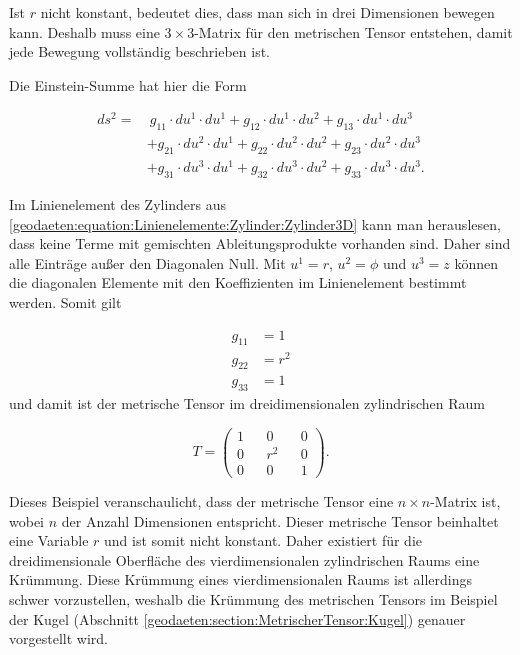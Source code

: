 Ist $r$ nicht konstant, bedeutet dies, dass man sich in drei Dimensionen bewegen kann.
Deshalb muss eine $3 \times 3$-Matrix für den metrischen Tensor entstehen, damit jede Bewegung vollständig beschrieben ist. 

Die Einstein-Summe hat hier die Form

\begin{equation}
\begin{aligned}
	ds^2 = &\ g_{11} \cdot du^1 \cdot du^1 + g_{12} \cdot du^1 \cdot du^2 + g_{13} \cdot du^1 \cdot du^3 \nonumber \\
	&+ g_{21} \cdot du^2 \cdot du^1 + g_{22} \cdot du^2 \cdot du^2 + g_{23} \cdot du^2 \cdot du^3 \nonumber \\
	&+ g_{31} \cdot du^3 \cdot du^1 + g_{32} \cdot du^3 \cdot du^2 + g_{33} \cdot du^3 \cdot du^3  .
\end{aligned} 
	\label{geodaeten:equation:MetrischerTensor:Kartesisch:EinsteinSumme3D}
\end{equation}

Im Linienelement des Zylinders aus \eqref{geodaeten:equation:Linienelemente:Zylinder:Zylinder3D} kann man herauslesen, dass keine Terme mit gemischten Ableitungsprodukte vorhanden sind.
Daher sind alle Einträge außer den Diagonalen Null.
Mit $u^1 = r$, $u^2 = \phi$ und $u^3 = z$  können die diagonalen Elemente mit den Koeffizienten im Linienelement bestimmt werden. 
Somit gilt

\begin{equation}
	\begin{aligned}
		g_{11}  &= 1  \\
		g_{22}  &= r^2 \\
		g_{33}  &= 1  
	\end{aligned}
\end{equation}
und damit ist der metrische Tensor im dreidimensionalen zylindrischen Raum

\begin{equation}
	T = \begin{pmatrix} 1 && 0 && 0 \\ 0 && r^2 && 0 \\ 0 && 0 && 1 \end{pmatrix} .
\end{equation}

Dieses Beispiel veranschaulicht, dass der metrische Tensor eine $n \times n$-Matrix ist, wobei $n$ der Anzahl Dimensionen entspricht.
Dieser metrische Tensor beinhaltet eine Variable $r$ und ist somit nicht konstant. 
Daher existiert für die dreidimensionale Oberfläche des vierdimensionalen zylindrischen Raums eine Krümmung.
Diese Krümmung eines vierdimensionalen Raums ist allerdings schwer vorzustellen, weshalb die Krümmung des metrischen Tensors im Beispiel der Kugel (Abschnitt \ref{geodaeten:section:MetrischerTensor:Kugel}) genauer vorgestellt wird.
